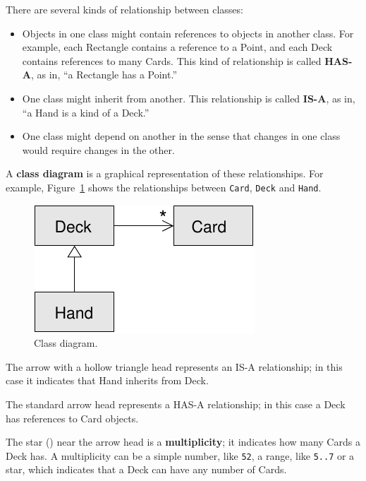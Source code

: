 \documentclass[10pt]{book}
\begin{document}
There are several kinds of relationship between classes:

\begin{itemize}

\item Objects in one class might contain references to objects
in another class.  For example, each Rectangle contains a reference
to a Point, and each Deck contains references to many Cards.
This kind of relationship is called {\bf HAS-A}, as in, ``a Rectangle
has a Point.''

\item One class might inherit from another.  This relationship
is called {\bf IS-A}, as in, ``a Hand is a kind of a Deck.''

\item One class might depend on another in the sense that changes
in one class would require changes in the other.

\end{itemize}

A {\bf class diagram} is a graphical representation of these
relationships.  For example, Figure~\ref{fig.class1} shows the
relationships between {\tt Card}, {\tt Deck} and {\tt Hand}.

\begin{figure}
\centerline
{\includegraphics[scale=0.8]{figs/class1.pdf}}
\caption{Class diagram.}
\label{fig.class1}
\end{figure}


The arrow with a hollow triangle head represents an IS-A
relationship; in this case it indicates that Hand inherits
from Deck.

The standard arrow head represents a HAS-A
relationship; in this case a Deck has references to Card
objects.

The star ({\tt *}) near the arrow head is a
{\bf multiplicity}; it indicates how many Cards a Deck has.
A multiplicity can be a simple number, like {\tt 52}, a range,
like {\tt 5..7} or a star, which indicates that a Deck can
have any number of Cards.
\end{document}
